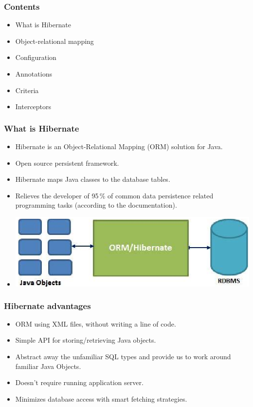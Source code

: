 \documentclass[10pt,xcolor=pdflatex]{beamer}
\begin{document}

\begin{frame}\frametitle{Contents}
  \begin{itemize}
    \item What is Hibernate
	\item Object-relational mapping
	\item Configuration
	\item Annotations
	\item Criteria
	\item Interceptors
  \end{itemize}
\end{frame}

\begin{frame}\frametitle{What is Hibernate}
	\begin{itemize}
		\item Hibernate is an Object-Relational Mapping (ORM) solution for Java.
		\item Open source persistent framework.
		\item Hibernate maps Java classes to the database tables.
		\item Relieves the developer of 95\,\% of common data persistence related programming tasks (according to the documentation).
        \normalsize
        \medskip
        \item[] \includegraphics[width=0.8\paperwidth]{img/pic5.png}
	\end{itemize}
\end{frame}


\begin{frame}\frametitle{Hibernate advantages}
	\begin{itemize}
        \item ORM using XML files, without writing a line of code.
        \item Simple API for storing/retrieving Java objects.
        \item Abstract away the unfamiliar SQL types and provide us to work around familiar Java Objects.
		\item Doesn't require running application server.
        \item Minimizes database access with smart fetching strategies.
	\end{itemize}
\end{frame}
\end{document}
